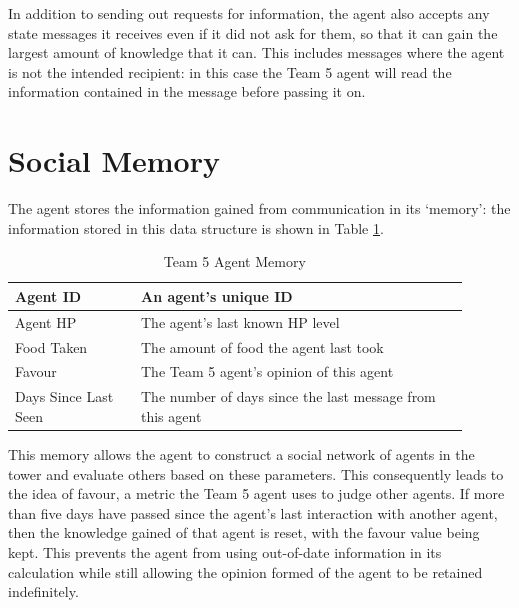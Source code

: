 In addition to sending out requests for information, the agent also accepts any state messages it receives even if it did not ask for them, so that it can gain the largest amount of knowledge that it can. This includes messages where the agent is not the intended recipient: in this case the Team 5 agent will read the information contained in the message before passing it on.

\section{Social Memory}\label{sec:team5-memory}
The agent stores the information gained from communication in its `memory': the information stored in this data structure is shown in Table \ref{tab:team5-memory}.

\begin{table}
    \centering
    \begin{tabular}%
        {| >{\raggedleft\arraybackslash}p{0.25\linewidth} | %
        >{\raggedright\arraybackslash}p{0.65\linewidth} | %
        }
        \hline
        Agent ID & An agent's unique ID\\
        \hline
        Agent HP & The agent's last known HP level\\
        \hline
        Food Taken & The amount of food the agent last took\\
        \hline
        Favour & The Team 5 agent's opinion of this agent\\
        \hline
        Days Since Last Seen & The number of days since the last message from this agent\\
        \hline
    \end{tabular}
    \caption{Team 5 Agent Memory}
    \label{tab:team5-memory}
\end{table}

This memory allows the agent to construct a social network of agents in the tower and evaluate others based on these parameters. This consequently leads to the idea of favour, a metric the Team 5 agent uses to judge other agents. If more than five days have passed since the agent's last interaction with another agent, then the knowledge gained of that agent is reset, with the favour value being kept. This prevents the agent from using out-of-date information in its calculation while still allowing the opinion formed of the agent to be retained indefinitely.

